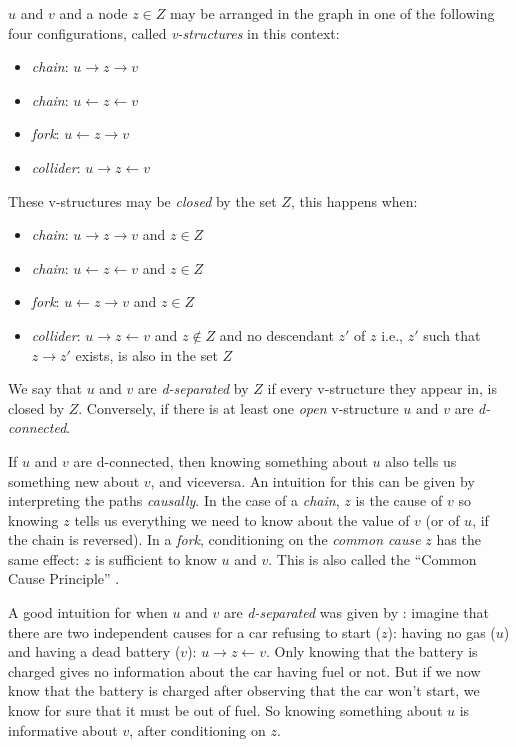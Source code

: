 $u$ and $v$ and a node $z \in Z$ may be arranged in the graph in one of the following four configurations, called \textit{v-structures} in this context:
\begin{itemize}
  \item \textit{chain}: $u \rightarrow z \rightarrow v$
  \item \textit{chain}: $u \leftarrow z \leftarrow v$
  \item \textit{fork}: $u \leftarrow z \rightarrow v$
  \item \textit{collider}: $u \rightarrow z \leftarrow v$
\end{itemize}

These v-structures may be \textit{closed} by the set $Z$, this happens when:
\begin{itemize}
  \item \textit{chain}: $u \rightarrow z \rightarrow v$ and $z \in Z$
  \item \textit{chain}: $u \leftarrow z \leftarrow v$ and $z \in Z$
  \item \textit{fork}: $u \leftarrow z \rightarrow v$ and $z \in Z$
  \item \textit{collider}: $u \rightarrow z \leftarrow v$ and $z \notin Z$ and no descendant $z'$ of $z$ i.e., $z'$ such that $z \rightarrow z'$ exists, is also in the set $Z$
\end{itemize}

We say that $u$ and $v$ are \textit{d-separated} by $Z$ if every v-structure they appear in, is closed by $Z$.
Conversely, if there is at least one \textit{open} v-structure $u$ and $v$ are \textit{d-connected}.

If $u$ and $v$ are d-connected, then knowing something about $u$ also tells us something new about $v$, and viceversa.
An intuition for this can be given by interpreting the paths \textit{causally}.
In the case of a \textit{chain}, $z$ is the cause of $v$ so knowing $z$ tells us everything we need to know about the value of $v$ (or of $u$, if the chain is reversed).
In a \textit{fork}, conditioning on the \textit{common cause} $z$ has the same effect: $z$ is sufficient to know $u$ and $v$.
This is also called the \enquote{Common Cause Principle} \citep{sober1988principle}.

A good intuition for when $u$ and $v$ are \textit{d-separated} was given by \citet{Pearl1988}: imagine that there are two independent causes for a car refusing to start ($z$): having no gas ($u$) and having a dead battery ($v$): $u \rightarrow z \leftarrow  v$.
Only knowing that the battery is charged gives no information about the car having fuel or not.
But if we now know that the battery is charged after observing that the car won't start, we know for sure that it must be out of fuel.
So knowing something about $u$ is informative about $v$, after conditioning on $z$.


